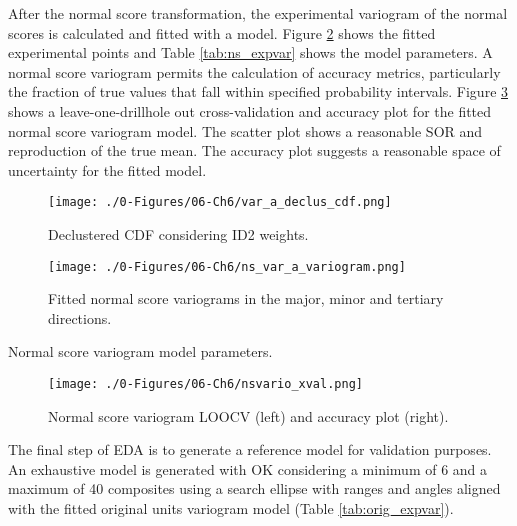 After the normal score transformation, the experimental variogram of the normal scores is calculated and fitted with a model. Figure \ref{fig:ns_expvar} shows the fitted experimental points and Table \ref{tab:ns_expvar} shows the model parameters. A normal score variogram permits the calculation of accuracy metrics, particularly the fraction of true values that fall within specified probability intervals. Figure \ref{fig:ns_xval} shows a leave-one-drillhole out cross-validation and accuracy plot for the fitted normal score variogram model. The scatter plot shows a reasonable \gls{SOR} and reproduction of the true mean. The accuracy plot suggests a reasonable space of uncertainty for the fitted model.

\begin{figure}[htb!]
    \centering
    \texttt{[image: ./0-Figures/06-Ch6/var\_a\_declus\_cdf.png]}
    \caption{ Declustered \gls{CDF} considering \gls{ID2} weights. }
    \label{fig:declus_cdf}
\end{figure}

\begin{figure}[htb!]
    \centering
    \texttt{[image: ./0-Figures/06-Ch6/ns\_var\_a\_variogram.png]}
    \caption{Fitted normal score variograms in the major, minor and tertiary directions. }
    \label{fig:ns_expvar}
\end{figure}

\begin{table}[!htb]
    \centering
    \caption{Normal score variogram model parameters.}
    \resizebox{1\width}{!}{}
    \label{tab:ns_expvar}
\end{table}

\begin{figure}[htb!]
    \centering
    \texttt{[image: ./0-Figures/06-Ch6/nsvario\_xval.png]}
    \caption{Normal score variogram \gls{LOOCV} (left) and accuracy plot (right).}
    \label{fig:ns_xval}
\end{figure}

The final step of \gls{EDA} is to generate a reference model for validation purposes. An exhaustive model is generated with \gls{OK} considering a minimum of 6 and a maximum of 40 composites using a search ellipse with ranges and angles aligned with the fitted original units variogram model (Table \ref{tab:orig_expvar}).

\FloatBarrier
